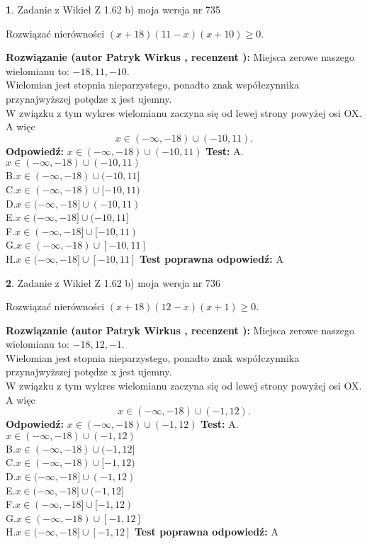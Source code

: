 \documentclass[12pt, a4paper]{article}
\theoremstyle{definition} %
\newtheorem{zad}{}
\newcommand{\zadStart}[1]{\begin{zad}#1\newline}
\newcommand{\zadStop}{\end{zad}}
\newcommand{\rozwStart}[2]{\noindent \textbf{Rozwiązanie (autor #1 , recenzent #2): }\newline}
\newcommand{\rozwStop}{\newline}
\newcommand{\odpStart}{\noindent \textbf{Odpowiedź:}\newline}
\newcommand{\odpStop}{\newline}
\newcommand{\testStart}{\noindent \textbf{Test:}\newline}
\newcommand{\testStop}{\newline}
\newcommand{\kluczStart}{\noindent \textbf{Test poprawna odpowiedź:}\newline}
\newcommand{\kluczStop}{\newline}
\begin{document}
\zadStart{Zadanie z Wikieł Z 1.62 b) moja wersja nr 735}

Rozwiązać nierówności $(x+18)(11-x)(x+10)\ge0$.
\zadStop
\rozwStart{Patryk Wirkus}{}
Miejsca zerowe naszego wielomianu to: $-18, 11, -10$.\\
Wielomian jest stopnia nieparzystego, ponadto znak współczynnika przy\linebreak najwyższej potędze x jest ujemny.\\ W związku z tym wykres wielomianu zaczyna się od lewej strony powyżej osi OX. A więc $$x \in (-\infty,-18) \cup (-10,11).$$
\rozwStop
\odpStart
$x \in (-\infty,-18) \cup (-10,11)$
\odpStop
\testStart
A.$x \in (-\infty,-18) \cup (-10,11)$\\
B.$x \in (-\infty,-18) \cup (-10,11]$\\
C.$x \in (-\infty,-18) \cup [-10,11)$\\
D.$x \in (-\infty,-18] \cup (-10,11)$\\
E.$x \in (-\infty,-18] \cup (-10,11]$\\
F.$x \in (-\infty,-18] \cup [-10,11)$\\
G.$x \in (-\infty,-18) \cup [-10,11]$\\
H.$x \in (-\infty,-18] \cup [-10,11]$
\testStop
\kluczStart
A
\kluczStop



\zadStart{Zadanie z Wikieł Z 1.62 b) moja wersja nr 736}

Rozwiązać nierówności $(x+18)(12-x)(x+1)\ge0$.
\zadStop
\rozwStart{Patryk Wirkus}{}
Miejsca zerowe naszego wielomianu to: $-18, 12, -1$.\\
Wielomian jest stopnia nieparzystego, ponadto znak współczynnika przy\linebreak najwyższej potędze x jest ujemny.\\ W związku z tym wykres wielomianu zaczyna się od lewej strony powyżej osi OX. A więc $$x \in (-\infty,-18) \cup (-1,12).$$
\rozwStop
\odpStart
$x \in (-\infty,-18) \cup (-1,12)$
\odpStop
\testStart
A.$x \in (-\infty,-18) \cup (-1,12)$\\
B.$x \in (-\infty,-18) \cup (-1,12]$\\
C.$x \in (-\infty,-18) \cup [-1,12)$\\
D.$x \in (-\infty,-18] \cup (-1,12)$\\
E.$x \in (-\infty,-18] \cup (-1,12]$\\
F.$x \in (-\infty,-18] \cup [-1,12)$\\
G.$x \in (-\infty,-18) \cup [-1,12]$\\
H.$x \in (-\infty,-18] \cup [-1,12]$
\testStop
\kluczStart
A
\kluczStop
\end{document}
